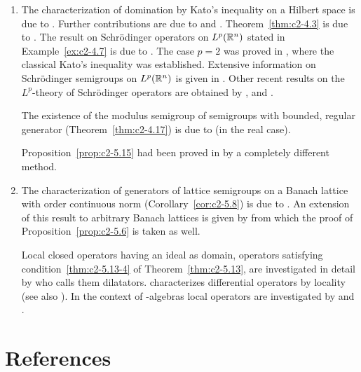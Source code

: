\begin{enumerate}[label=\emph{Section \arabic*:}, wide]
\item  The characterization of domination by Kato's inequality on a Hilbert space is due to \textcite{simon:1977}. Further contributions are due to \textcite{hessetal:1977} and \textcite{kishimotorobinson:1980}. Theorem~\ref{thm:c2-4.3} is due to \textcite{arendt:1984b}. The result on Schrödinger operators on $L^p(\mathbb{R}^n)$ stated in Example~\ref{ex:c2-4.7} is due to \textcite{kato:1986}. The case $p = 2$ was proved in \textcite{kato:1973}, where the classical Kato's inequality was established. Extensive information on Schrödinger semigroups on $L^p(\mathbb{R}^n)$ is given in \textcite{simon:1982}. Other recent results on the $L^p$-theory of Schrödinger operators are obtained by \textcite{davies:1986}, \textcite{okazawa:1984} and \textcite{voigt:1984a}.

The existence of the modulus semigroup of semigroups with bounded, regular generator (Theorem~\ref{thm:c2-4.17}) is due to \textcite{derndinger:1984} (in the real case).

Proposition~\ref{prop:c2-5.15}   had been proved in \textcite{schaeferetal:1978} by a completely different method.
 
\item  
The characterization of generators of lattice semigroups on a Banach lattice with order continuous norm (Corollary~\ref{cor:c2-5.8}) is due to \textcite{nageluhlig:1981}. An extension of this result to arbitrary Banach lattices is given by \textcite{arendt:1982} from which the proof of  Proposition~\ref{prop:c2-5.6}   is taken as well.

Local closed operators having an ideal as domain, \ie operators satisfying condition~\ref{thm:c2-5.13-4} of Theorem~\ref{thm:c2-5.13}, are investigated in detail by \textcite{nakano:1950} who calls them dilatators. \textcite{peetre:1959} characterizes differential operators by locality (see also \textcite{luxemburg:1979}). In the context of \CA-algebras local operators are investigated by \textcite{battyrobinson:1984} and \textcite{battyrobinson:1985}.

\end{enumerate}
\section*{References}
{\RaggedRight
  \printbibliography[heading=none]
 }
